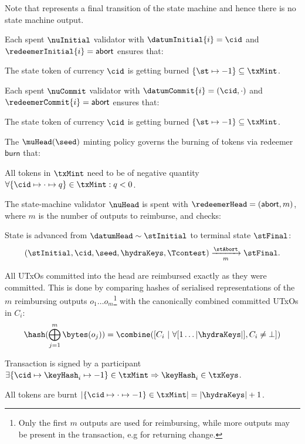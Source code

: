 Note that \mtxAbort{} represents a final transition of the state
machine and hence there is no state machine output.

\noindent Each spent $\nuInitial$ validator with $\datumInitial{i} = \cid$ and $\redeemerInitial{i} = \mathsf{abort}$ ensures that:
\begin{menumerate}
  \item The state token of currency $\cid$ is getting burned $\{\st \mapsto -1\} \subseteq \txMint$.
\end{menumerate}

\noindent Each spent $\nuCommit$ validator with $\datumCommit{i} = (\cid,\cdot)$ and $\redeemerCommit{i} = \mathsf{abort}$ ensures that:
\begin{menumerate}
  \item The state token of currency $\cid$ is getting burned $\{\st \mapsto -1\} \subseteq \txMint$.
\end{menumerate}

\noindent The $\muHead(\seed)$ minting policy governs the burning of tokens via
redeemer $\mathsf{burn}$ that:
\begin{menumerate}
  \item All tokens in $\txMint$ need to be of negative quantity
  $\forall \{\cid \mapsto \cdot \mapsto q\} \in \txMint : q < 0$.
\end{menumerate}

\noindent The state-machine validator $\nuHead$ is spent with
$\redeemerHead = (\mathsf{abort}, m)$, where $m$ is the number of outputs to
reimburse, and checks:
\begin{menumerate}
  \item State is advanced from $\datumHead \sim \stInitial$ to terminal state
  $\stFinal$:
  \[
	(\stInitial,\cid,\seed,\hydraKeys,\Tcontest) \xrightarrow[m]{\stAbort} \stFinal.
  \]
  \item All UTxOs committed into the head are reimbursed exactly as they were
  committed. This is done by comparing hashes of serialised representations of
  the $m$ reimbursing outputs $o_{1} \dots o_{m}$\footnote{Only the first $m$
	outputs are used for reimbursing, while more outputs may be present in the
	transaction, e.g for returning change.} with the canonically combined
  committed UTxOs in $C_{i}$:
  \[
	\hash(\bigoplus_{j=1}^{m} \bytes(o_{j})) = \combine([C_{i} ~ | ~ \forall [1 \dots |\hydraKeys|], C_{i} \neq \bot])
  \]

  \item Transaction is signed by a participant $\exists \{\cid \mapsto \keyHash_{i} \mapsto -1\} \in \txMint \Rightarrow \keyHash_{i} \in \txKeys$.
  \item All tokens are burnt
  $|\{\cid \mapsto \cdot \mapsto -1\} \in \txMint| = |\hydraKeys| + 1$.
\end{menumerate}

